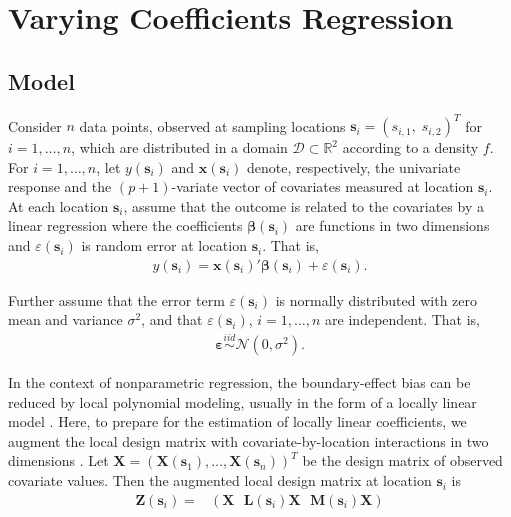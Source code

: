 \documentclass[12pt,english,authoryear, review]{article}\usepackage[]{graphicx}\usepackage[]{color}
\theoremstyle{plain}
\theoremstyle{plain}
\begin{document}
\section{Varying Coefficients Regression\label{sec:vcr}}


\subsection{Model}

Consider $n$ data points, observed at sampling locations $\bm{s}_{i}=(s_{i,1},\; s_{i,2})^{T}$
for $i=1,\dots,n$, which are distributed in a domain $\mathcal{D}\subset\mathbb{R}^{2}$
according to a density $f$. For $i=1,\dots,n$, let $y(\bm{s}_{i})$
and $\bm{x}(\bm{s}_{i})$ denote, respectively, the univariate response
and the $(p+1)$-variate vector of covariates measured at location
$\bm{s}_{i}$. At each location $\bm{s}_{i}$, assume that the outcome
is related to the covariates by a linear regression where the coefficients
$\bm{\beta}(\bm{s}_{i})$ are functions in two dimensions and $\varepsilon(\bm{s}_{i})$
is random error at location $\bm{s}_{i}$. That is, 
\begin{align}
y(\bm{s}_{i})=\bm{x}(\bm{s}_{i})'\bm{\beta}(\bm{s}_{i})+\varepsilon(\bm{s}_{i}).\label{eq:lm(s)}
\end{align}


Further assume that the error term $\varepsilon(\bm{s}_{i})$ is normally
distributed with zero mean and variance $\sigma^{2}$, and that $\varepsilon(\bm{s}_{i})$,
$i=1,\dots,n$ are independent. That is, 
\begin{align}
\bm{\varepsilon}\overset{iid}{\sim}\mathcal{N}\left(0,\sigma^{2}\right).\label{eq:err}
\end{align}


In the context of nonparametric regression, the boundary-effect bias
can be reduced by local polynomial modeling, usually in the form of
a locally linear model \citep{Fan-Gijbels-1996}. Here, to prepare
for the estimation of locally linear coefficients, we augment the
local design matrix with covariate-by-location interactions in two
dimensions \citep{Wang-2008b}. Let $\bm{X}=\left(\bm{X}\left(\bm{s}_{1}\right),\dots,\bm{X}\left(\bm{s}_{n}\right)\right)^{T}$
be the design matrix of observed covariate values. Then the augmented
local design matrix at location $\bm{s}_{i}$ is 
\begin{align}
\bm{Z}(\bm{s}_{i})= & \left(\bm{X}\ \:\:\bm{L}\left(\bm{s}_{i}\right)\bm{X}\ \:\:\bm{M}\left(\bm{s}_{i}\right)\bm{X}\right)\label{eq:augmented-covariates}
\end{align}
\end{document}
